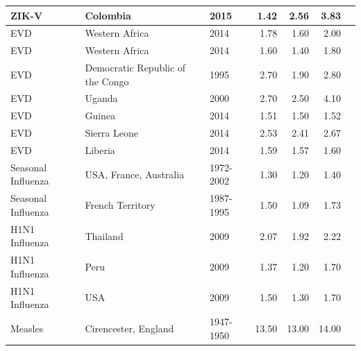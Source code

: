 \documentclass[12pt]{article}
\begin{document}
\begin{landscape}
\begin{table}
\begin{tabular}{@{}lllrrrl@{}}
ZIK-V                & Colombia                         & 2015                          & 1.42        & 2.56           & 3.83           & \cite{majumder2016}  \\ \hline
EVD               & Western Africa                   & 2014                          & 1.78        & 1.60            & 2.00              & \cite{fisman2014}   \\
EVD & Western Africa                   & 2014                          & 1.60         & 1.40            & 1.80            & \cite{towers2014}  \\
EVD                 & Democratic Republic of the Congo & 1995                          & 2.70         & 1.90            & 2.80            & \cite{legrand2007}  \\
EVD                 & Uganda                           & 2000                          & 2.70         & 2.50            & 4.10            & \cite{legrand2007}  \\
EVD                 & Guinea                           & 2014                          & 1.51        & 1.50            & 1.52           & \cite{althaus2014}   \\
EVD                 & Sierra Leone                     & 2014                          & 2.53        & 2.41           & 2.67           & \cite{althaus2014}      \\
EVD                 & Liberia                          & 2014                          & 1.59        & 1.57           & 1.60            & \cite{althaus2014}    \\ \hline
Seasonal Influenza  & USA, France, Australia           & 1972-2002 & 1.30         & 1.20            & 1.40            & \cite{chowell2008}  \\
Seasonal Influenza  & French Territory                 & 1987-1995                     & 1.50         & 1.09           & 1.73           & \cite{bonabeau1998}  \\ \hline
H1N1 Influenza      & Thailand                         & 2009                          & 2.07        & 1.92           & 2.22           & \cite{desilva2009}     \\
  H1N1 Influenza     & Peru                             & 2009                          & 1.37        & 1.20            & 1.70            & \cite{desilva2009}        \\ 
  H1N1 Influenza & USA & 2009 & 1.50 & 1.30 & 1.70 &\cite{towers2009} \\ \hline
Measles      & Cirencester, England                 & 1947-1950                          & 13.50   & 13.00           & 14.00            & \cite{fraser2009}     \\ 

\end{tabular}
\end{table}
\end{landscape}
\end{document}
